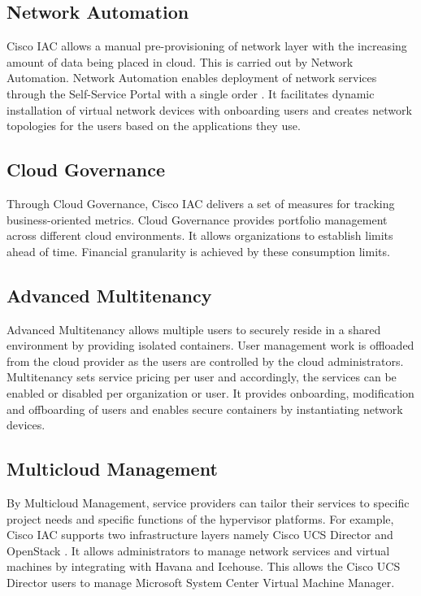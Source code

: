 \documentclass[9pt,twocolumn,twoside]{../../styles/osajnl}
\begin{document}
\subsection{Network Automation}

Cisco IAC allows a manual pre-provisioning of network layer with the
increasing amount of data being placed in cloud. This is carried out
by Network Automation. Network Automation enables deployment of
network services through the Self-Service Portal with a single order
\cite{cisco-mondora}. It facilitates dynamic installation of virtual
network devices with onboarding users and creates network topologies
for the users based on the applications they use.

\subsection{Cloud Governance}

Through Cloud Governance, Cisco IAC delivers a set of measures for
tracking business-oriented metrics. Cloud Governance provides
portfolio management across different cloud environments. It allows
organizations to establish limits ahead of time. Financial granularity
is achieved by these consumption limits.

\subsection{Advanced Multitenancy}

Advanced Multitenancy allows multiple users to securely reside in a
shared environment by providing isolated containers. User management
work is offloaded from the cloud provider as the users are controlled
by the cloud administrators. Multitenancy sets service pricing per
user and accordingly, the services can be enabled or disabled per
organization or user. It provides onboarding, modification and
offboarding of users and enables secure containers by instantiating
network devices.

\subsection{Multicloud Management}

By Multicloud Management, service providers can tailor their services
to specific project needs and specific functions of the hypervisor
platforms. For example, Cisco IAC supports two infrastructure layers
namely Cisco UCS Director and OpenStack \cite{cisco-mondora}. It
allows administrators to manage network services and virtual machines
by integrating with Havana and Icehouse. This allows the Cisco UCS
Director users to manage Microsoft System Center Virtual Machine
Manager.
\end{document}
